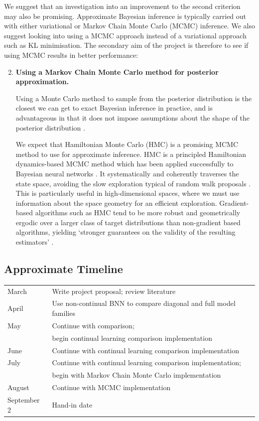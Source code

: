 \documentclass[a4paper,11=0pt]{article}
\begin{document}
We suggest that an investigation into an improvement to the second criterion may also be promising. Approximate Bayesian inference is typically carried out with either variational or Markov Chain Monte Carlo (MCMC) inference. We also suggest looking into using a MCMC approach instead of a variational approach such as KL minimisation. The secondary aim of the project is therefore to see if using MCMC results in better performance:
\begin{enumerate}
\setcounter{enumi}{1}
\item \textbf{Using a Markov Chain Monte Carlo method for posterior approximation.}

Using a Monte Carlo method to sample from the posterior distribution is the closest we can get to exact Bayesian inference in practice, and is advantageous in that it does not impose assumptions about the shape of the posterior distribution \cite{hinton}.

We expect that Hamiltonian Monte Carlo (HMC) is a promising MCMC method to use for approximate inference. HMC is a principled Hamiltonian dynamics-based MCMC method which has been applied successfully to Bayesian neural networks \cite{bayesianlearning}. It systematically and coherently traverses the state space, avoiding the slow exploration typical of random walk proposals \cite{hmc}. This is particularly useful in high-dimensional spaces, where we must use information about the space geometry for an efficient exploration. Gradient-based algorithms such as HMC tend to be more robust and geometrically ergodic over a larger class of target distributions than non-gradient based algorithms, yielding `stronger guarantees on the validity of the resulting estimators' \cite{conceptual}.
\end{enumerate}


\subsection*{Approximate Timeline}

\begin{tabular}{l|l}
\hline
March 	& Write project proposal; review literature\\
April	& Use non-continual BNN to compare diagonal and full model families\\
May		& Continue with comparison; \\
&begin continual learning comparison implementation \\
June 	& Continue with continual learning comparison implementation\\
July	& Continue with continual learning comparison implementation; \\
&begin with Markov Chain Monte Carlo implementation\\
August	& Continue with MCMC implementation\\
September 2 & Hand-in date\\
\hline
\end{tabular}
\end{document}
